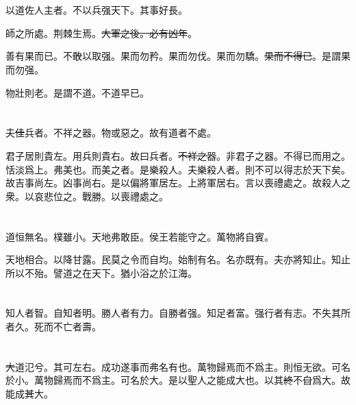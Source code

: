 \documentclass[a5paper]{ctexbook}
\newcommand{\bo}[1]{\textcolor[RGB]{0,255,255}{#1}}
\newcommand{\jian}[1]{\textcolor[RGB]{0,255,0}{#1}}
\def\del{\sout}
\begin{document}
    \chapter{}

    以道佐人主者。不以兵强天下。其事好\jian{長}。

    師之所處。荆棘生焉。\bo{\del{大軍之後。必有凶年}}。

    善有果而已。不\jian{\del{敢}}以取强。果而勿矜。果而勿伐。果而勿驕。\jian{\del{果而不得已}}。\jian{是謂}果而勿强。

    物壯則老。是謂不道。不道早已。

    \chapter{}

    夫\bo{\del{佳}}兵者。不祥之器。物或惡之。故有道者不處。

    君子居則貴左。用兵則貴右。\jian{故曰}兵者。\jian{\del{不祥之器}}。非君子之器。不得已而用之。恬淡爲上。\jian{弗美也}。而美之者。是樂殺人。夫樂殺人者。則不可以得志於天下矣。\jian{故}吉事尚左。凶事尚右。\jian{是以}偏將軍居左。上將軍居右。言以喪禮處之。\jian{故}殺人之衆。以哀悲\jian{位}之。戰勝。以喪禮處之。

    \chapter{}

    道\bo{恒}無名。樸雖小。\jian{天地弗敢臣}。侯王若能守之。萬物將自賓。

    天地相合。以降甘露。民莫之令而自均。始制有名。名亦既有。夫亦將知止。知止\jian{所以}不殆。譬道之在天下。猶\jian{小}浴之於江海。

    \chapter{}

    知人者智。自知者明。勝人者有力。自勝者强。知足者富。强行者有志。不失其所者久。死而不亡者壽。

    \chapter{}

    \bo{\del{大}}道氾兮。其可左右。\bo{成功遂事而弗名有也}。\bo{萬物歸焉而不爲主}。\bo{則}\bo{恒}无欲。可名於小。萬物歸焉而不爲主。可名於大。\bo{是以聖人之能成大也}。以其\bo{\del{終}}不\bo{\del{自}}爲大。故能成\del{其}大。
\end{document}
